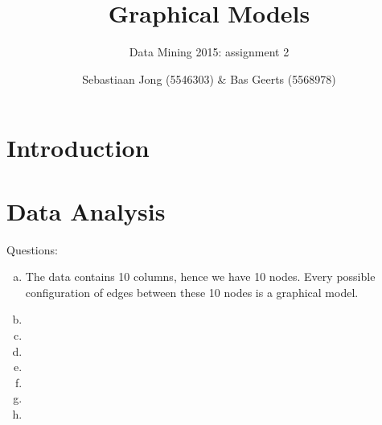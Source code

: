 \documentclass[a4paper,12pt]{scrartcl}
\begin{document}
\title{Graphical Models}
\subtitle{Data Mining 2015: assignment 2}
\author{Sebastiaan Jong (5546303) \& Bas Geerts (5568978)}
\date{}
\maketitle
\section{Introduction}
\section{Data Analysis}
Questions:
	\begin{enumerate}[(a)]
		\item The data contains 10 columns, hence we have 10 nodes. Every possible configuration of edges between these 10 nodes is a graphical model. 
		\item 
		\item 
		\item 
		\item 
		\item 
		\item 
		\item 
	\end{enumerate}
\end{document}
